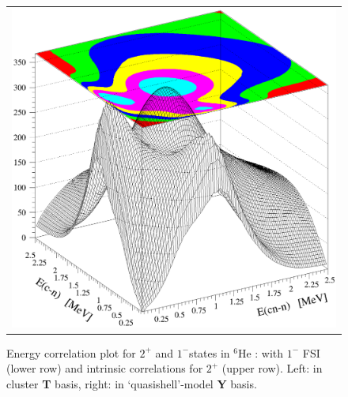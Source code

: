 \begin{figure}[tbh]
\begin{center}
\begin{tabular}{c}
\includegraphics[scale=0.31]{figures/1mcntot2.eps}
\end{tabular}
\end{center}
\vspace*{-0.2cm}
\caption{  Energy correlation plot for $2^+$ and $1^-$states in
$^6$He :
          with
         $1^-$ FSI (lower row) and intrinsic correlations for $2^+$
          (upper row). Left: in cluster {\bf T} basis, right: in
          `quasishell'-model {\bf Y} basis. }
\label{CorrPlot}
\end{figure}

